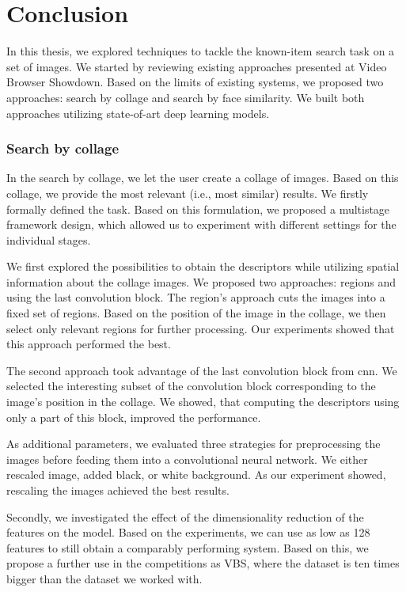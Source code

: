 \chapter*{Conclusion}

In this thesis, we explored techniques to tackle the known-item search task on a set of images. We started by reviewing existing approaches presented at Video Browser Showdown. Based on the limits of existing systems, we proposed two approaches: search by collage and search by face similarity. We built both approaches utilizing state-of-art deep learning models. 

\subsection*{Search by collage}

In the search by collage, we let the user create a collage of images. Based on this collage, we provide the most relevant (i.e., most similar) results. We firstly formally defined the task. Based on this formulation, we proposed a multistage framework design, which allowed us to experiment with different settings for the individual stages.

We first explored the possibilities to obtain the descriptors while utilizing spatial information about the collage images. We proposed two approaches: regions and using the last convolution block. The region's approach cuts the images into a fixed set of regions. Based on the position of the image in the collage, we then select only relevant regions for further processing. Our experiments showed that this approach performed the best. 

The second approach took advantage of the last convolution block from \acrshort{cnn}. We selected the interesting subset of the convolution block corresponding to the image's position in the collage. We showed, that computing the descriptors using only a part of this block, improved the performance. 

As additional parameters, we evaluated three strategies for preprocessing the images before feeding them into a convolutional neural network. We either rescaled image, added black, or white background. As our experiment showed, rescaling the images achieved the best results.

Secondly, we investigated the effect of the dimensionality reduction of the features on the model. Based on the experiments, we can use as low as 128 features to still obtain a comparably performing system. Based on this, we propose a further use in the competitions as VBS, where the dataset is ten times bigger than the dataset we worked with.

